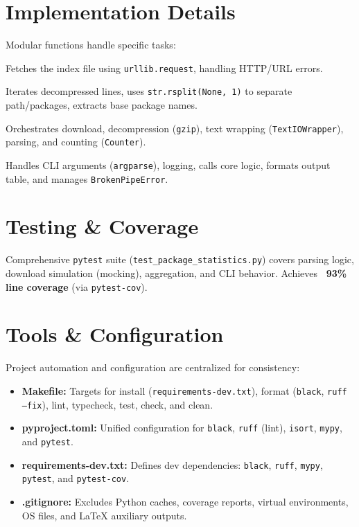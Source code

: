 \documentclass[10pt,a4paper]{article}
\begin{document}
\section*{Implementation Details}
\vspace{-0.5em}
Modular functions handle specific tasks:
\begin{description}[leftmargin=!,labelwidth=\widthof{\bfseries\texttt{download\_contents:}}, style=unboxed, itemsep=1pt]
	\item[\texttt{download\_contents:}] Fetches the index file using \texttt{urllib.request}, handling HTTP/URL errors.
	\item[\texttt{parse\_contents:}] Iterates decompressed lines, uses \texttt{str.rsplit(None, 1)} to separate path/packages, extracts base package names.
	\item[\texttt{get\_top\_packages:}] Orchestrates download, decompression (\texttt{gzip}), text wrapping (\texttt{TextIOWrapper}), parsing, and counting (\texttt{Counter}).
	\item[\texttt{main:}] Handles CLI arguments (\texttt{argparse}), logging, calls core logic, formats output table, and manages \texttt{BrokenPipeError}.
\end{description}

\section*{Testing \& Coverage}
\vspace{-0.5em}
Comprehensive \texttt{pytest} suite (\texttt{test\_package\_statistics.py}) covers parsing logic, download simulation (mocking), aggregation, and CLI behavior. Achieves \textbf{~93\% line coverage} (via \texttt{pytest-cov}).

\section*{Tools \& Configuration}
\vspace{-0.5em}
Project automation and configuration are centralized for consistency:
\begin{itemize}
	\item \textbf{Makefile:} Targets for install (\texttt{requirements-dev.txt}), format (\texttt{black}, \texttt{ruff --fix}), lint, typecheck, test, check, and clean.
	\item \textbf{pyproject.toml:} Unified configuration for \texttt{black}, \texttt{ruff} (lint), \texttt{isort}, \texttt{mypy}, and \texttt{pytest}.
	\item \textbf{requirements-dev.txt:} Defines dev dependencies: \texttt{black}, \texttt{ruff}, \texttt{mypy}, \texttt{pytest}, and \texttt{pytest-cov}.
	\item \textbf{.gitignore:} Excludes Python caches, coverage reports, virtual environments, OS files, and LaTeX auxiliary outputs.
\end{itemize}
\end{document}

